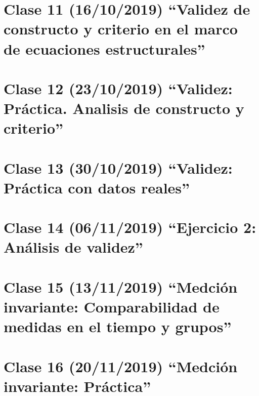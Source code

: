 \documentclass[11pt,]{article}
\begin{document}
\hypertarget{clase-11-16102019-validez-de-constructo-y-criterio-en-el-marco-de-ecuaciones-estructurales}{%
\section{Clase 11 (16/10/2019) ``Validez de constructo y criterio en el
marco de ecuaciones
estructurales''}\label{clase-11-16102019-validez-de-constructo-y-criterio-en-el-marco-de-ecuaciones-estructurales}}

\hypertarget{clase-12-23102019-validez-practica.-analisis-de-constructo-y-criterio}{%
\section{Clase 12 (23/10/2019) ``Validez: Práctica. Analisis de
constructo y
criterio''}\label{clase-12-23102019-validez-practica.-analisis-de-constructo-y-criterio}}

\hypertarget{clase-13-30102019-validez-practica-con-datos-reales}{%
\section{Clase 13 (30/10/2019) ``Validez: Práctica con datos
reales''}\label{clase-13-30102019-validez-practica-con-datos-reales}}

\hypertarget{clase-14-06112019-ejercicio-2-analisis-de-validez}{%
\section{Clase 14 (06/11/2019) ``Ejercicio 2: Análisis de
validez''}\label{clase-14-06112019-ejercicio-2-analisis-de-validez}}

\hypertarget{clase-15-13112019-medcion-invariante-comparabilidad-de-medidas-en-el-tiempo-y-grupos}{%
\section{Clase 15 (13/11/2019) ``Medción invariante: Comparabilidad de
medidas en el tiempo y
grupos''}\label{clase-15-13112019-medcion-invariante-comparabilidad-de-medidas-en-el-tiempo-y-grupos}}

\hypertarget{clase-16-20112019-medcion-invariante-practica}{%
\section{Clase 16 (20/11/2019) ``Medción invariante:
Práctica''}\label{clase-16-20112019-medcion-invariante-practica}}
\end{document}
